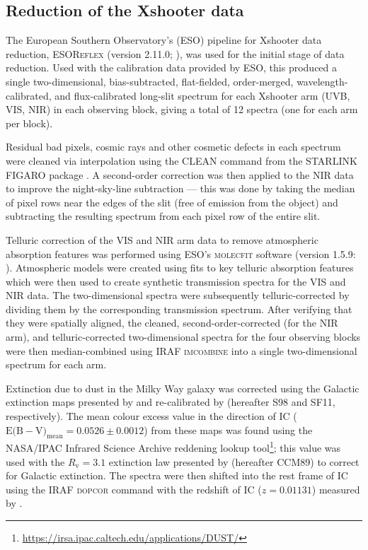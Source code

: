\subsection{Reduction of the Xshooter data}
\label{section: xshooter_ic_5063: observations_and_data_reduction: data_reduction}

The European Southern Observatory's (ESO) pipeline for Xshooter data reduction, \textsc{ESOReflex} (version 2.11.0; \citealt{Freudling2013}), was used for the initial stage of data reduction. Used with the calibration data provided by ESO, this produced a single two-dimensional, bias-subtracted, flat-fielded, order-merged, wavelength-calibrated, and flux-calibrated long-slit spectrum for each Xshooter arm (UVB, VIS, NIR) in each observing block, giving a total of 12 spectra (one for each arm per block).

Residual bad pixels, cosmic rays and other cosmetic defects in each spectrum were cleaned via interpolation using the \textsc{CLEAN} command from the \textsc{STARLINK FIGARO} package \citep{Currie2014}. A second-order correction was then applied to the NIR data to improve the night-sky-line subtraction --- this was done by taking the median of pixel rows near the edges of the slit (free of emission from the object) and subtracting the resulting spectrum from each pixel row of the entire slit.

Telluric correction of the VIS and NIR arm data to remove atmospheric absorption features was performed using ESO's \textsc{molecfit} software (version 1.5.9: \citealt{Smette2015, Kausch2015}). Atmospheric models were created using fits to key telluric absorption features which were then used to create synthetic transmission spectra for the VIS and NIR data. The two-dimensional spectra were subsequently telluric-corrected by dividing them by the corresponding transmission spectrum. After verifying that they were spatially aligned, the cleaned, second-order-corrected (for the NIR arm), and telluric-corrected two-dimensional spectra for the four observing blocks were then median-combined using \textsc{IRAF} \textsc{imcombine} \citep{Tody1986, Tody1993} into a single two-dimensional spectrum for each arm.

Extinction due to dust in the Milky Way galaxy was corrected using the Galactic extinction maps presented by \citet{Schlegel1998} and re-calibrated by \citet{Schlafly2011} (hereafter S98 and SF11, respectively). The mean colour excess value in the direction of IC \mbox{($\mathrm{E(B}-\mathrm{V)}_\mathrm{mean} = 0.0526\pm0.0012$)} from these maps was found using the NASA/IPAC Infrared Science Archive reddening lookup tool\footnote{\url{https://irsa.ipac.caltech.edu/applications/DUST/}}; this value was used with the $R_\mathrm{v}=3.1$ extinction law presented by \citet{Cardelli1989} (hereafter CCM89) to correct for Galactic extinction. The spectra were then shifted into the rest frame of IC using the \textsc{IRAF} \textsc{dopcor} command with the redshift of IC ($z=0.01131$) measured by \citet{Tadhunter2014}.


